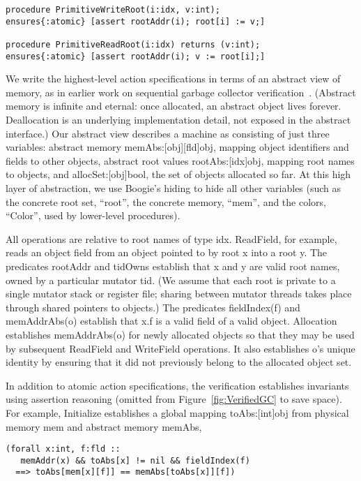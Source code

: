 \begin{verbatim}
procedure PrimitiveWriteRoot(i:idx, v:int);
ensures{:atomic} [assert rootAddr(i); root[i] := v;]

procedure PrimitiveReadRoot(i:idx) returns (v:int);
ensures{:atomic} [assert rootAddr(i); v := root[i];]
\end{verbatim}

We write the highest-level action specifications in terms of an abstract view of memory,
as in earlier work on sequential garbage collector verification~\cite{mccr07,hawb09}.
(Abstract memory is infinite and eternal: once allocated, an abstract object lives forever.
Deallocation is an underlying implementation detail, not exposed in the abstract interface.)
Our abstract view describes a machine as consisting of just three variables:
abstract memory memAbs:[obj][fld]obj, mapping object identifiers and fields to other objects,
abstract root values rootAbs:[idx]obj, mapping root names to objects, and
allocSet:[obj]bool, the set of objects allocated so far.
At this high layer of abstraction, we use Boogie's hiding to hide all other variables
(such as the concrete root set, ``root'', the concrete memory, ``mem'', and the colors, ``Color'', used by lower-level procedures).

All operations are relative to root names of type idx.
ReadField, for example, reads an object field from an object pointed to by root x into a root y.
The predicates rootAddr and tidOwns establish that x and y are valid root names, owned by a particular mutator tid.
(We assume that each root is private to a single mutator stack or register file;
sharing between mutator threads takes place through shared pointers to objects.)
The predicates fieldIndex(f) and memAddrAbs(o) establish that x.f is a valid field of a valid object.
Allocation establishes memAddrAbs(o) for newly allocated objects so that they may be used by subsequent ReadField and WriteField operations.
It also establishes o's unique identity by ensuring that it did not previously belong to the allocated object set.

In addition to atomic action specifications, the verification establishes invariants using assertion reasoning
(omitted from Figure~\ref{fig:VerifiedGC} to save space).
For example, Initialize establishes a global mapping toAbs:[int]obj from physical memory mem and abstract memory memAbs,

\begin{verbatim}
(forall x:int, f:fld ::
   memAddr(x) && toAbs[x] != nil && fieldIndex(f)
  ==> toAbs[mem[x][f]] == memAbs[toAbs[x]][f])
\end{verbatim}

